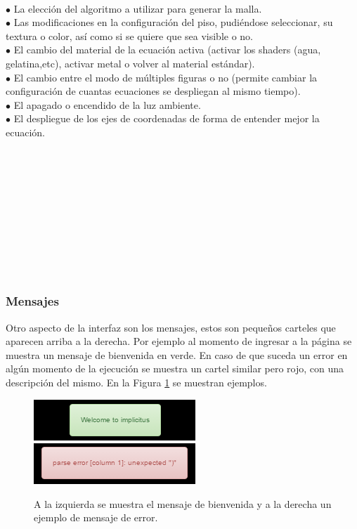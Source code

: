 \documentclass[12pt]{article}
\begin{document}
\\$\bullet$ La elección del algoritmo a utilizar para generar la malla.
\\$\bullet$ Las modificaciones en la configuración del piso, pudiéndose seleccionar, su textura o color, así como si se quiere que sea visible o no.
\\$\bullet$ El cambio del material de la ecuación activa (activar los shaders (agua, gelatina,etc), activar metal o volver al material estándar).
\\$\bullet$ El cambio entre el modo de múltiples figuras o no (permite cambiar la configuración de cuantas ecuaciones se despliegan al mismo tiempo).
\\$\bullet$ El apagado o encendido de la luz ambiente.
\\$\bullet$ El despliegue de los ejes de coordenadas de forma de entender mejor la ecuación.
\\\\\\\\\\\\\\\\\\\\\\
\subsubsection{Mensajes}
Otro aspecto de la interfaz son los mensajes, estos son pequeños carteles que aparecen arriba a la derecha. Por ejemplo al momento de ingresar a la página se muestra un mensaje de bienvenida en verde. En caso de que suceda un error en algún momento de la ejecución se muestra un cartel similar pero  rojo, con una descripción del mismo. En la Figura \ref{mensajes} se muestran ejemplos.
\begin{figure}[h!]
\includegraphics[width =0.45\linewidth]{welcome.png}
\hfill
\includegraphics[width =0.45\linewidth]{error.png}
\caption{A la izquierda se muestra el mensaje de bienvenida y a la derecha un ejemplo de mensaje de error.}
\label{mensajes}
\end{figure}
\end{document}
